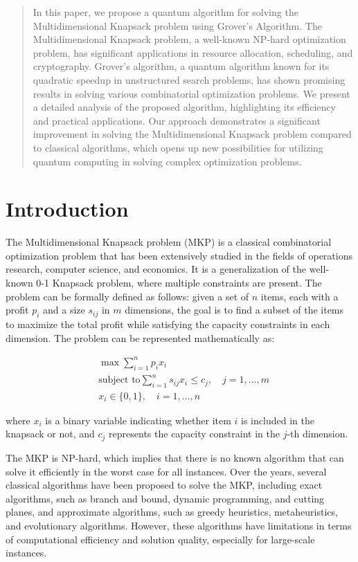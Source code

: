 \begin{abstract}
In this paper, we propose a quantum algorithm for solving the Multidimensional Knapsack problem using Grover's Algorithm. The Multidimensional Knapsack problem, a well-known NP-hard optimization problem, has significant applications in resource allocation, scheduling, and cryptography. Grover's algorithm, a quantum algorithm known for its quadratic speedup in unstructured search problems, has shown promising results in solving various combinatorial optimization problems. We present a detailed analysis of the proposed algorithm, highlighting its efficiency and practical applications. Our approach demonstrates a significant improvement in solving the Multidimensional Knapsack problem compared to classical algorithms, which opens up new possibilities for utilizing quantum computing in solving complex optimization problems.
\end{abstract}

\section{Introduction}
\label{sec:introduction}

The Multidimensional Knapsack problem (MKP) is a classical combinatorial optimization problem that has been extensively studied in the fields of operations research, computer science, and economics. It is a generalization of the well-known 0-1 Knapsack problem, where multiple constraints are present. The problem can be formally defined as follows: given a set of $n$ items, each with a profit $p_i$ and a size $s_{ij}$ in $m$ dimensions, the goal is to find a subset of the items to maximize the total profit while satisfying the capacity constraints in each dimension. The problem can be represented mathematically as:

\begin{align*}
    &\max \sum_{i=1}^{n} p_i x_i \\
    &\text{subject to} \sum_{i=1}^{n} s_{ij} x_i \leq c_j, \quad j = 1, \ldots, m \\
    &x_i \in \{0, 1\}, \quad i = 1, \ldots, n
\end{align*}

where $x_i$ is a binary variable indicating whether item $i$ is included in the knapsack or not, and $c_j$ represents the capacity constraint in the $j$-th dimension.

The MKP is NP-hard, which implies that there is no known algorithm that can solve it efficiently in the worst case for all instances. Over the years, several classical algorithms have been proposed to solve the MKP, including exact algorithms, such as branch and bound, dynamic programming, and cutting planes, and approximate algorithms, such as greedy heuristics, metaheuristics, and evolutionary algorithms. However, these algorithms have limitations in terms of computational efficiency and solution quality, especially for large-scale instances.

